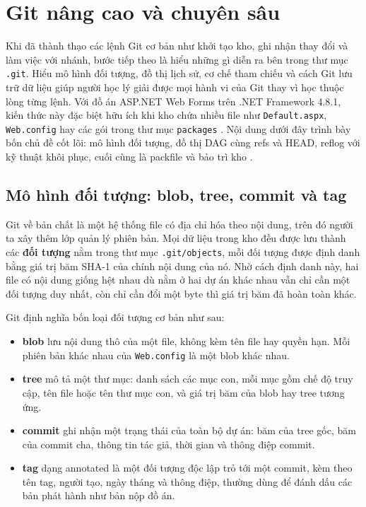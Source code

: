 \section{Git nâng cao và chuyên sâu}
\label{sec:c31-internals}

Khi đã thành thạo các lệnh Git cơ bản như khởi tạo kho, ghi nhận thay đổi và làm việc với nhánh, bước tiếp theo là hiểu những gì diễn ra bên trong thư mục \verb|.git|.
Hiểu mô hình đối tượng, đồ thị lịch sử, cơ chế tham chiếu và cách Git lưu trữ dữ liệu giúp người học lý giải được mọi hành vi của Git thay vì học thuộc lòng từng lệnh.
Với đồ án ASP.NET Web Forms trên .NET Framework 4.8.1, kiến thức này đặc biệt hữu ích khi kho chứa nhiều file như \verb|Default.aspx|, \verb|Web.config| hay các gói trong thư mục \verb|packages| \cite{msnetfx}.
Nội dung dưới đây trình bày bốn chủ đề cốt lõi: mô hình đối tượng, đồ thị DAG cùng refs và HEAD, reflog với kỹ thuật khôi phục, cuối cùng là packfile và bảo trì kho \cite{progit}.

\subsection{Mô hình đối tượng: blob, tree, commit và tag}
\label{subsec:c31-object}

Git về bản chất là một hệ thống file có địa chỉ hóa theo nội dung, trên đó người ta xây thêm lớp quản lý phiên bản.
Mọi dữ liệu trong kho đều được lưu thành các \textbf{đối tượng} nằm trong thư mục \verb|.git/objects|, mỗi đối tượng được định danh bằng giá trị băm SHA-1 của chính nội dung của nó.
Nhờ cách định danh này, hai file có nội dung giống hệt nhau dù nằm ở hai dự án khác nhau vẫn chỉ cần một đối tượng duy nhất, còn chỉ cần đổi một byte thì giá trị băm đã hoàn toàn khác.

Git định nghĩa bốn loại đối tượng cơ bản như sau:

\begin{itemize}
\item \textbf{blob} lưu nội dung thô của một file, không kèm tên file hay quyền hạn. Mỗi phiên bản khác nhau của \verb|Web.config| là một blob khác nhau.
\item \textbf{tree} mô tả một thư mục: danh sách các mục con, mỗi mục gồm chế độ truy cập, tên file hoặc tên thư mục con, và giá trị băm của blob hay tree tương ứng.
\item \textbf{commit} ghi nhận một trạng thái của toàn bộ dự án: băm của tree gốc, băm của commit cha, thông tin tác giả, thời gian và thông điệp commit.
\item \textbf{tag} dạng annotated là một đối tượng độc lập trỏ tới một commit, kèm theo tên tag, người tạo, ngày tháng và thông điệp, thường dùng để đánh dấu các bản phát hành như bản nộp đồ án.
\end{itemize}

